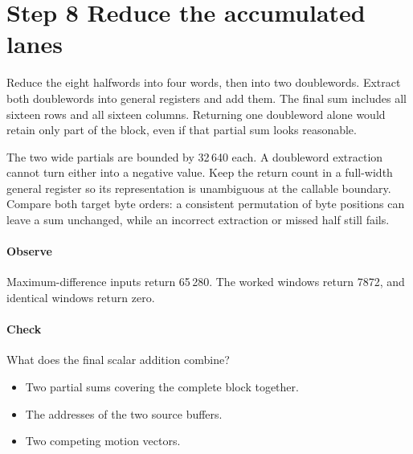 \section{Step 8 Reduce the accumulated lanes}\label{h263-sad-s08}
Reduce the eight halfwords into four words, then into two doublewords. Extract
both doublewords into general registers and add them. The final sum includes all
sixteen rows and all sixteen columns. Returning one doubleword alone would retain
only part of the block, even if that partial sum looks reasonable.

The two wide partials are bounded by 32\,640 each. A doubleword extraction cannot
turn either into a negative value. Keep the return count in a full-width general
register so its representation is unambiguous at the callable boundary. Compare
both target byte orders: a consistent permutation of byte positions can leave a
sum unchanged, while an incorrect extraction or missed half still fails.

\paragraph{Observe} Maximum-difference inputs return 65\,280. The worked windows
return 7872, and identical windows return zero.
\paragraph{Check} What does the final scalar addition combine?
\begin{itemize}
  \item[A.] Two partial sums covering the complete block together.
  \item[B.] The addresses of the two source buffers.
  \item[C.] Two competing motion vectors.
\end{itemize}
